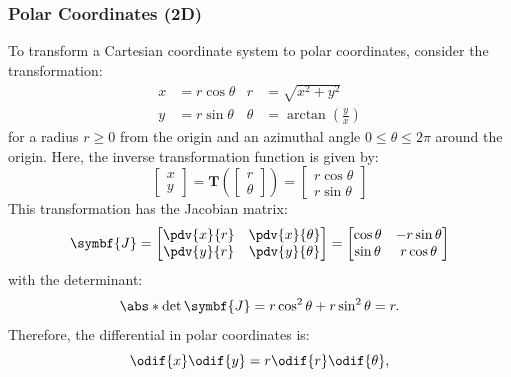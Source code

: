 \documentclass{article}
\begin{document}
\subsubsection{Polar Coordinates (2D)}
To transform a Cartesian coordinate system to polar coordinates,
consider the transformation:
\begin{align*}
    x & = r \cos{\theta} & r      & = \sqrt{x^2 + y^2}                    \\
    y & = r \sin{\theta} & \theta & = \arctan{\left( \frac{y}{x} \right)}
\end{align*}
for a radius \(r \geqslant 0\) from the origin and an azimuthal angle
\(0 \leqslant \theta \leqslant 2\pi\) around the origin. Here, the
inverse transformation function is given by:
\begin{equation*}
    \begin{bmatrix}
        x \\
        y
    \end{bmatrix}
    = \symbf{T}\left(
    \begin{bmatrix}
            r \\
            \theta
        \end{bmatrix}
    \right) =
    \begin{bmatrix}
        r \cos{\theta} \\
        r \sin{\theta}
    \end{bmatrix}
\end{equation*}
This transformation has the Jacobian matrix:
\begin{equation*}
    \symbf{J} =
    \begin{bmatrix}
        \displaystyle\pdv{x}{r} & \displaystyle\pdv{x}{\theta} \\
        \displaystyle\pdv{y}{r} & \displaystyle\pdv{y}{\theta}
    \end{bmatrix}
    =
    \begin{bmatrix}
        \cos{\theta} & -r \sin{\theta} \\
        \sin{\theta} & r \cos{\theta}
    \end{bmatrix}
\end{equation*}
with the determinant:
\begin{equation*}
    \abs*{\det{\symbf{J}}} = r \cos^2{\theta} + r \sin^2{\theta} = r.
\end{equation*}
Therefore, the differential in polar coordinates is:
\begin{equation*}
    \odif{x} \odif{y} = r \odif{r} \odif{\theta},
\end{equation*}
\end{document}
